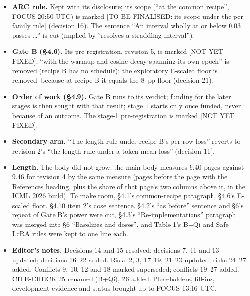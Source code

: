 \documentclass{article}
\theoremstyle{plain}
\theoremstyle{definition}
\theoremstyle{remark}
\begin{document}
\begin{itemize}
        erosion harm''), so recipe G's erosion is ``refusal erosion''. Numbers
        only in the development evidence.
  \item \textbf{ARC rule.} Kept with its disclosure; its scope (``at the common
        recipe'', FOCUS 20:50 UTC) is marked [TO BE FINALISED: its scope under
        the per-family rule] (decision 16). The sentence ``An interval wholly at
        or below 0.03 passes \ldots{}'' is cut (implied by ``resolves a
        straddling interval'').
  \item \textbf{Gate B (\S{}4.6).} Its pre-registration, revision 5, is marked
        [NOT YET FIXED]; ``with the warmup and cosine decay spanning its own
        epoch'' is removed (recipe B has no schedule); the exploratory E-scaled
        floor is removed, because at recipe B it equals the 8~pp floor (decision
        21).
  \item \textbf{Order of work (\S{}4.9).} Gate B runs to its verdict; funding
        for the later stages is then sought with that result; stage 1 starts
        only once funded, never because of an outcome. The stage-1
        pre-registration is marked [NOT YET FIXED].
  \item \textbf{Secondary arm.} ``The length rule under recipe B's per-row
        loss'' reverts to revision 2's ``the length rule under a token-mean
        loss'' (decision 11).
  \item \textbf{Length.} The body did not grow: the main body measures 9.40
        pages against 9.46 for revision 4 by the same measure (pages before the
        page with the References heading, plus the share of that page's two
        columns above it, in the ICML 2026 build). To make room, \S{}4.1's
        common-recipe paragraph, \S{}4.6's E-scaled floor, \S{}4.10 item 2's
        dose sentence, \S{}4.2's ``as before'' sentence and \S{}6's repeat of
        Gate B's power were cut, \S{}4.3's ``Re-implementations'' paragraph was
        merged into \S{}6 ``Baselines and doses'', and Table 1's B+Qi and Safe
        LoRA rules were kept to one line each.
  \item \textbf{Editor's notes.} Decisions 14 and 15 resolved; decisions 7, 11
        and 13 updated; decisions 16--22 added. Risks 2, 3, 17--19, 21--23
        updated; risks 24--27 added. Conflicts 9, 10, 12 and 18 marked
        superseded; conflicts 19--27 added. CITE-CHECK 25 renamed (B+Qi); 26
        added. Placeholders, fill-ins, development evidence and status brought
        up to FOCUS 13:16 UTC.
\end{itemize}
\end{document}
